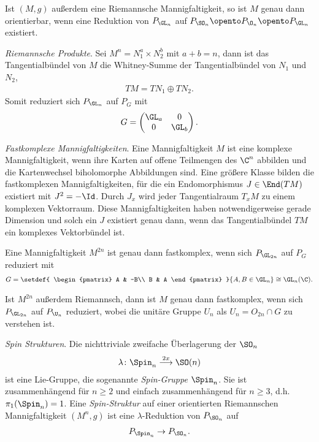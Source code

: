 \documentclass[%
	paper=a5,%
	fleqn,%
	DIV=18,%
	BCOR=0mm,
	fontsize=11pt,
	titlepage=false,%
	bibliography=totoc,
	DIV=18,%
	twoside=true,
	pdftitle=Riemannsche Geometrie,
	pdfauthor=Uwe Semmelmann,
	numbers=noendperiod]%
	{scrbook}
\begin{document}
\begin{ex}
\begin{exenum}
Ist $(M,g)$ außerdem eine Riemannsche Mannigfaltigkeit, so ist $M$ genau dann
orientierbar, wenn eine Reduktion von $P_{\GL_n}$ auf $P_{\SO_n}\opento
P_{\O_n}\opento P_{\GL_n}$ existiert.
\item \textit{Riemannsche Produkte}. Sei $M^n = N_1^a \times N_2^b$ mit $a+b =
n$, dann ist das Tangentialbündel von $M$ die Whitney-Summe der Tangentialbündel
von $N_1$ und $N_2$,
\begin{align*}
TM = TN_1\oplus TN_2.
\end{align*}
Somit reduziert sich $P_{\GL_n}$ auf $P_G$ mit
\begin{align*}
G = 
\begin{pmatrix}
\GL_a & 0 \\
0 & \GL_b
\end{pmatrix}.
\end{align*}
\item \textit{Fastkomplexe Mannigfaltigkeiten}. Eine Mannigfaltigkeit $M$ ist
eine komplexe Mannigfaltigkeit, wenn ihre Karten  auf offene
Teilmengen des $\C^n$ abbilden und die Kartenwechsel biholomorphe Abbildungen sind. 
Eine größere Klasse bilden die fastkomplexen
Mannigfaltigkeiten, für die ein Endomorphismus $J\in \End(TM)$ existiert
mit $J^2 = -\Id$. Durch $J_x$ wird jeder Tangentialraum $T_xM$ zu einem komplexen
Vektorraum.
Diese Mannigfaltigkeiten haben notwendigerweise gerade
Dimension und solch ein $J$ existiert genau dann, wenn das Tangentialbündel $TM$
ein komplexes Vektorbündel ist.

Eine Mannigfaltigkeit $M^{2n}$ ist genau dann fastkomplex, wenn sich
$P_{\GL_{2n}}$ auf $P_G$ reduziert mit
\begin{align*}
G = 
\setdef{
\begin{pmatrix}
A & -B\\
B & A
\end{pmatrix}
}{A,B\in \GL_n} \cong \GL_n(\C) .
\end{align*}

Ist $M^{2n}$ außerdem Riemannsch, dann ist $M$ genau dann fastkomplex, wenn sich
$P_{\GL_{2n}}$ auf $P_{\U_n}$ reduziert, wobei die unitäre Gruppe  $U_n$ als $U_n = O_{2n}\cap G$
zu verstehen ist.
\item \textit{Spin Strukturen}.
Die nichttriviale zweifache Überlagerung der $\SO_n$
\begin{align*}
\lambda\colon \Spin_n \overset{2x}{\longrightarrow} \SO(n)
\end{align*}
ist eine Lie-Gruppe, die sogenannte \emph{Spin-Gruppe} $\Spin_n$. Sie ist
zusammenhängend für $n\ge 2$ und einfach zusammenhängend für $n\ge 3$, d.h.
$\pi_1(\Spin_n) = 1$. Eine \emph{Spin-Struktur} auf einer orientierten
Riemannschen Mannigfaltigkeit $(M^n,g)$ ist eine $\lambda$-Reduktion von
$P_{\SO_n}$ auf
\begin{align*}
P_{\Spin_n}\to P_{\SO_n}.
\end{align*}


\end{exenum}
\end{ex}
\end{document}
